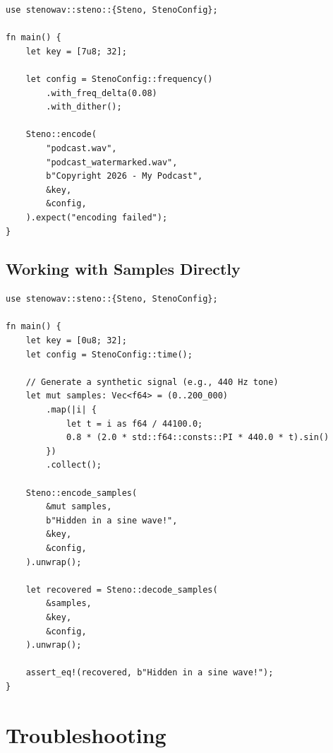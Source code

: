 \documentclass[11pt,a4paper]{article}
\begin{document}
\begin{lstlisting}[style=rust]
use stenowav::steno::{Steno, StenoConfig};

fn main() {
    let key = [7u8; 32];

    let config = StenoConfig::frequency()
        .with_freq_delta(0.08)
        .with_dither();

    Steno::encode(
        "podcast.wav",
        "podcast_watermarked.wav",
        b"Copyright 2026 - My Podcast",
        &key,
        &config,
    ).expect("encoding failed");
}
\end{lstlisting}

\subsection{Working with Samples Directly}

\begin{lstlisting}[style=rust]
use stenowav::steno::{Steno, StenoConfig};

fn main() {
    let key = [0u8; 32];
    let config = StenoConfig::time();

    // Generate a synthetic signal (e.g., 440 Hz tone)
    let mut samples: Vec<f64> = (0..200_000)
        .map(|i| {
            let t = i as f64 / 44100.0;
            0.8 * (2.0 * std::f64::consts::PI * 440.0 * t).sin()
        })
        .collect();

    Steno::encode_samples(
        &mut samples,
        b"Hidden in a sine wave!",
        &key,
        &config,
    ).unwrap();

    let recovered = Steno::decode_samples(
        &samples,
        &key,
        &config,
    ).unwrap();

    assert_eq!(recovered, b"Hidden in a sine wave!");
}
\end{lstlisting}


\section{Troubleshooting}
\end{document}
